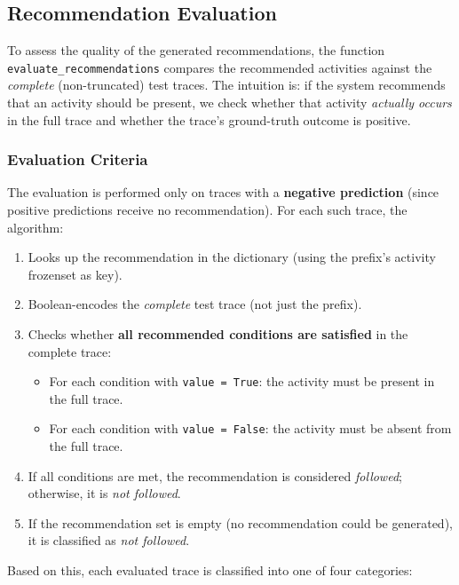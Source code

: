 \documentclass{article}
\begin{document}

\subsection{Recommendation Evaluation}

To assess the quality of the generated recommendations, the function \texttt{evaluate\_recommendations} compares the recommended activities against the \textit{complete} (non-truncated) test traces. The intuition is: if the system recommends that an activity should be present, we check whether that activity \textit{actually occurs} in the full trace and whether the trace's ground-truth outcome is positive.

\subsubsection{Evaluation Criteria}

The evaluation is performed only on traces with a \textbf{negative prediction} (since positive predictions receive no recommendation). For each such trace, the algorithm:
\begin{enumerate}
    \item Looks up the recommendation in the dictionary (using the prefix's activity frozenset as key).
    \item Boolean-encodes the \textit{complete} test trace (not just the prefix).
    \item Checks whether \textbf{all recommended conditions are satisfied} in the complete trace:
    \begin{itemize}
        \item For each condition with \texttt{value = True}: the activity must be present in the full trace.
        \item For each condition with \texttt{value = False}: the activity must be absent from the full trace.
    \end{itemize}
    \item If all conditions are met, the recommendation is considered \textit{followed}; otherwise, it is \textit{not followed}.
    \item If the recommendation set is empty (no recommendation could be generated), it is classified as \textit{not followed}.
\end{enumerate}

\noindent
Based on this, each evaluated trace is classified into one of four categories:
\end{document}
